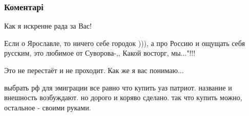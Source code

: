  
 
 
 
 
\subsubsection{Коментарі}

\begin{minipage}{0.6\textwidth}
\begin{itemize} %
Как я искренне рада за Вас!

Если о Ярославле, то ничего себе городок ))), а про Россию и ощущать себя
русским, это любимое от Суворова-,, Какой восторг, мы..."!!!

Это не перестаёт и не проходит. Как же я вас понимаю...


выбрать рф для эмиграции все равно что купить уаз патриот. название и внешность
возбуждают. но дорого и коряво сделано. так что купить можно, остальное -
своими руками.

\end{itemize} %
\end{minipage}

